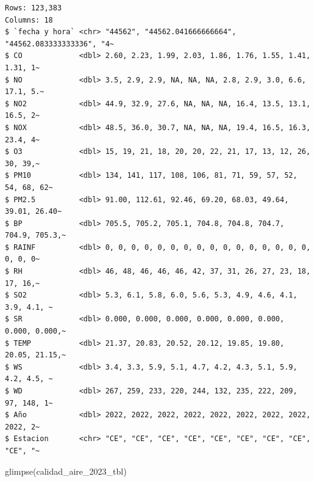 \documentclass[
  letterpaper,
  DIV=11,
  numbers=noendperiod]{scrartcl}
\newenvironment{Shaded}{\begin{snugshade}}{\end{snugshade}}
\newcommand{\FunctionTok}[1]{\textcolor[rgb]{0.28,0.35,0.67}{#1}}
\newcommand{\NormalTok}[1]{\textcolor[rgb]{0.00,0.23,0.31}{#1}}
\begin{document}
\begin{verbatim}
Rows: 123,383
Columns: 18
$ `fecha y hora` <chr> "44562", "44562.041666666664", "44562.083333333336", "4~
$ CO             <dbl> 2.60, 2.23, 1.99, 2.03, 1.86, 1.76, 1.55, 1.41, 1.31, 1~
$ NO             <dbl> 3.5, 2.9, 2.9, NA, NA, NA, 2.8, 2.9, 3.0, 6.6, 17.1, 5.~
$ NO2            <dbl> 44.9, 32.9, 27.6, NA, NA, NA, 16.4, 13.5, 13.1, 16.5, 2~
$ NOX            <dbl> 48.5, 36.0, 30.7, NA, NA, NA, 19.4, 16.5, 16.3, 23.4, 4~
$ O3             <dbl> 15, 19, 21, 18, 20, 20, 22, 21, 17, 13, 12, 26, 30, 39,~
$ PM10           <dbl> 134, 141, 117, 108, 106, 81, 71, 59, 57, 52, 54, 68, 62~
$ PM2.5          <dbl> 91.00, 112.61, 92.46, 69.20, 68.03, 49.64, 39.01, 26.40~
$ BP             <dbl> 705.5, 705.2, 705.1, 704.8, 704.8, 704.7, 704.9, 705.3,~
$ RAINF          <dbl> 0, 0, 0, 0, 0, 0, 0, 0, 0, 0, 0, 0, 0, 0, 0, 0, 0, 0, 0~
$ RH             <dbl> 46, 48, 46, 46, 46, 42, 37, 31, 26, 27, 23, 18, 17, 16,~
$ SO2            <dbl> 5.3, 6.1, 5.8, 6.0, 5.6, 5.3, 4.9, 4.6, 4.1, 3.9, 4.1, ~
$ SR             <dbl> 0.000, 0.000, 0.000, 0.000, 0.000, 0.000, 0.000, 0.000,~
$ TEMP           <dbl> 21.37, 20.83, 20.52, 20.12, 19.85, 19.80, 20.05, 21.15,~
$ WS             <dbl> 3.4, 3.3, 5.9, 5.1, 4.7, 4.2, 4.3, 5.1, 5.9, 4.2, 4.5, ~
$ WD             <dbl> 267, 259, 233, 220, 244, 132, 235, 222, 209, 97, 148, 1~
$ Año            <dbl> 2022, 2022, 2022, 2022, 2022, 2022, 2022, 2022, 2022, 2~
$ Estacion       <chr> "CE", "CE", "CE", "CE", "CE", "CE", "CE", "CE", "CE", "~
\end{verbatim}

\begin{Shaded}
\begin{Highlighting}[]
\FunctionTok{glimpse}\NormalTok{(calidad\_aire\_2023\_tbl)}
\end{Highlighting}
\end{Shaded}
\end{document}
